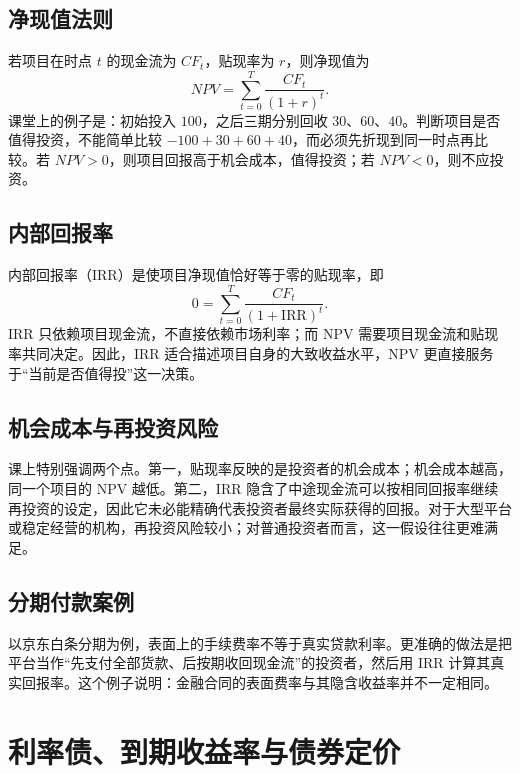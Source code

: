 \documentclass[UTF8,11pt,a4paper]{ctexart}
\begin{document}
\subsection{净现值法则}

若项目在时点 $t$ 的现金流为 $CF_t$，贴现率为 $r$，则净现值为
\begin{equation}
  NPV = \sum_{t=0}^{T} \frac{CF_t}{(1+r)^t}.
\end{equation}
课堂上的例子是：初始投入 $100$，之后三期分别回收 $30$、$60$、$40$。判断项目是否值得投资，不能简单比较 $-100 + 30 + 60 + 40$，而必须先折现到同一时点再比较。若 $NPV > 0$，则项目回报高于机会成本，值得投资；若 $NPV < 0$，则不应投资。

\subsection{内部回报率}

内部回报率（IRR）是使项目净现值恰好等于零的贴现率，即
\begin{equation}
  0 = \sum_{t=0}^{T} \frac{CF_t}{(1+\mathrm{IRR})^t}.
\end{equation}
IRR 只依赖项目现金流，不直接依赖市场利率；而 NPV 需要项目现金流和贴现率共同决定。因此，IRR 适合描述项目自身的大致收益水平，NPV 更直接服务于“当前是否值得投”这一决策。

\subsection{机会成本与再投资风险}

课上特别强调两个点。第一，贴现率反映的是投资者的机会成本；机会成本越高，同一个项目的 NPV 越低。第二，IRR 隐含了中途现金流可以按相同回报率继续再投资的设定，因此它未必能精确代表投资者最终实际获得的回报。对于大型平台或稳定经营的机构，再投资风险较小；对普通投资者而言，这一假设往往更难满足。

\subsection{分期付款案例}

以京东白条分期为例，表面上的手续费率不等于真实贷款利率。更准确的做法是把平台当作“先支付全部货款、后按期收回现金流”的投资者，然后用 IRR 计算其真实回报率。这个例子说明：金融合同的表面费率与其隐含收益率并不一定相同。

\section{利率债、到期收益率与债券定价}
\end{document}
